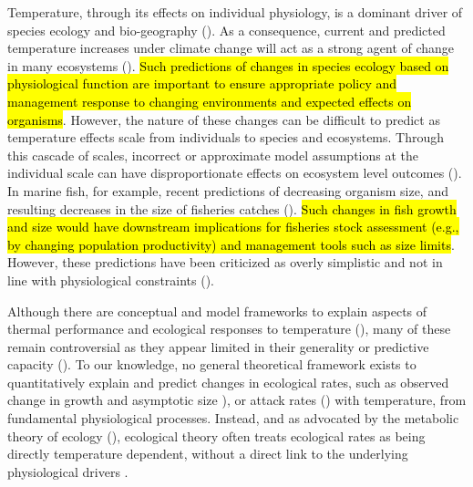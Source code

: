 \documentclass[11pt]{article}\usepackage[]{graphicx}\usepackage[]{color,soul}
\begin{document}
Temperature, through its effects on individual physiology, is a dominant driver of species ecology and bio-geography (\citealt{deutsch_climate_2015,pinsky_marine_2013}). As a consequence, current and predicted temperature increases under climate change will act as a strong agent of change in many ecosystems (\citealt{deutsch_climate_2015, stuart-smith_thermal_2015, parmesan_globally_2003, walther_ecological_2002}).  \hl{Such predictions of changes in species ecology based on physiological function are important to ensure appropriate policy and management response to changing environments and expected effects on organisms}\cite{mckenzieconservation2016, pattersonperspective2016}. However, the nature of these changes can be difficult to predict as temperature effects scale from individuals to species and ecosystems. Through this cascade of scales, incorrect or approximate model assumptions at the individual scale can have disproportionate effects on ecosystem level outcomes (\citealt{brander_overconfidence_2013, lefevre_models_2017}). In marine fish, for example, recent predictions of decreasing organism size, and resulting decreases in the size of fisheries catches (\citealt{cheung_shrinking_2013}). \hl{Such changes in fish growth and size would have downstream implications for fisheries stock assessment (e.g., by changing population productivity) and management tools such as size limits}. However, these predictions have been criticized as overly simplistic and not in line with physiological constraints (\citealt{brander_overconfidence_2013, lefevre_models_2017}).

Although there are conceptual and model frameworks to explain aspects of thermal performance and ecological responses to temperature (\citealt{fry_effects_1947,brown_toward_2004,pauly_sound_2017,portner_oxygen-and_2010}), many of these remain controversial as they appear limited in their generality or predictive capacity (\citealt{lefevre_models_2017,jutfelt_oxygen-and_2018}). To our knowledge, no general theoretical framework exists to quantitatively explain and predict changes in  ecological rates, such as observed change in growth and asymptotic size \cite[e.g., the temerature-size rule in ectotherms;][]{angilletta_temperature_2004,atkinson_temperature_1994}), or attack rates (\citealt{englund_temperature_2011,rall_universal_2012}) with temperature, from fundamental physiological processes. Instead, and as advocated by the metabolic theory of ecology (\citealt{brown_toward_2004}), ecological theory often treats ecological rates as being directly temperature dependent, without a direct link to the underlying physiological drivers \cite[e.g., ][]{angilletta_temperature_2004,vucic-pestic_warming_2011, guiet_effects_2016}. 
\end{document}
